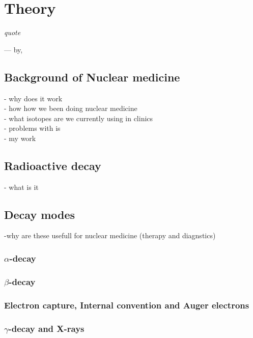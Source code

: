 \documentclass[twoside,english]{uiofysmaster/uiofysmaster}
\begin{document}
\chapter{Theory}
\label{ch: beyond}

\epigraph{\itshape quote}{--- \textup{by}, }
 


\section{Background of Nuclear medicine}
\label{sec:Background}

- why does it work \\
- how how we been doing nuclear medicine	\\
- what isotopes are we currently using in clinics\\
- problems with is\\
- my work\\


\section{Radioactive decay}
\label{sec:Radioactivedecay}

- what is it
 
\section{Decay modes}
\label{sec:decaymodes}

-why are these usefull for nuclear medicine (therapy and diagnstics)

\subsection{$\alpha$-decay}

\subsection{$\beta$-decay}


\subsection{Electron capture, Internal convention and Auger electrons}

\subsection{$\gamma$-decay and X-rays}
\end{document}
